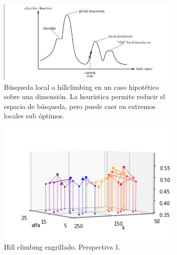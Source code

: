 \begin{figure}[ht]
  \begin{subfigure}{.5\textwidth}
  \begin{center}
    \includegraphics[width=1.0\textwidth]{./img/hillclimbing-choreado.png}
  \end{center}
  \caption{Búsqueda local o hillclimbing en un caso hipotético sobre
    una dimensión. La heurística permite reducir el espacio de
    búsqueda, pero puede caer en extremos locales sub óptimos.}
  \label{fig:hill-choreado}
  \end{subfigure}
  \begin{subfigure}{.5\textwidth}
    \begin{center}
      \includegraphics[width=1.0\textwidth]{./img/hillclimbing-1.png}
    \end{center}
    \caption{Hill climbing engrillado. Perspectiva 1.}
    \label{fig:hill-1}
  \end{subfigure}
  \begin{subfigure}{.5\textwidth}
    \begin{center}

\end{center}
\end{subfigure}
\end{figure}
